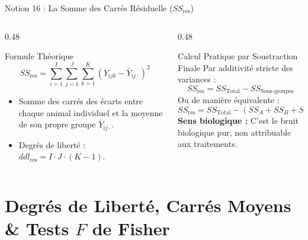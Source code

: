 \documentclass[aspectratio=169,10pt]{beamer}
\begin{document}
\begin{frame}{Notion 16 : La Somme des Carrés Résiduelle ($SS_{\text{res}}$)}
  \begin{columns}[onlytextwidth, T]
    \begin{column}{0.48\linewidth}
      \begin{conceptbox}{Formule Théorique}
        \begin{equation*}
          SS_{\text{res}} = \sum_{i=1}^I \sum_{j=1}^J \sum_{k=1}^K (Y_{ijk} - \bar{Y}_{ij\cdot})^2
        \end{equation*}
        \begin{itemize}
          \item Somme des carrés des écarts entre chaque animal individuel et la moyenne de son propre groupe $\bar{Y}_{ij\cdot}$.
          \item Degrés de liberté : $ddl_{\text{res}} = I \cdot J \cdot (K - 1)$.
        \end{itemize}
      \end{conceptbox}
    \end{column}
    \begin{column}{0.48\linewidth}
      \begin{takeawaybox}{Calcul Pratique par Soustraction Finale}
        Par additivité stricte des variances :
        \begin{equation*}
          SS_{\text{res}} = SS_{\text{Total}} - SS_{\text{Sous-groupes}}
        \end{equation*}
        Ou de manière équivalente :
        \begin{equation*}
          SS_{\text{res}} = SS_{\text{Total}} - (SS_A + SS_B + SS_{AB})
        \end{equation*}
        \textbf{Sens biologique :} C'est le bruit biologique pur, non attribuable aux traitements.
      \end{takeawaybox}
    \end{column}
  \end{columns}
\end{frame}

\section{Degrés de Liberté, Carrés Moyens \& Tests $F$ de Fisher}
\end{document}
